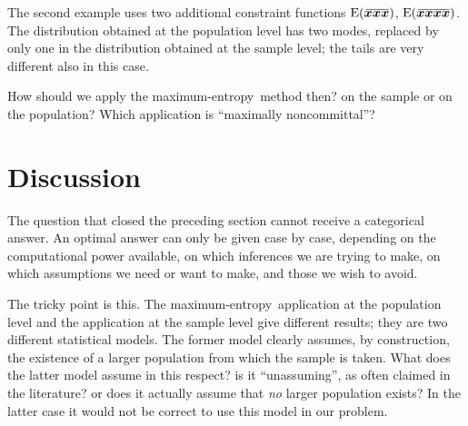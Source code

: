\documentclass{article}
\theoremstyle{remark}
\theoremstyle{innote}
\renewcommand*{\|}{\mathpunct{|}}%
\newcommand*{\E}{\mathrm{E}}
\DeclarePairedDelimiter\expp{(}{)}
\newcommand*{\expe}{\E\expp}%
\theoremstyle{simple}
\newcommand*{\widebar}[1]{{\mkern1.5mu\skew{2}\overline{\mkern-1.5mu#1\mkern-1.5mu}\mkern 1.5mu}}
\newcommand*{\sav}{\widebar} %
\newcommand*{\yxx}{x}%
\newcommand*{\yx}{\bm{\yxx}}%
\newcommand*{\me}{maximum-entropy}
\begin{document}
The second
example uses two additional constraint functions $\expe{\sav{\yx\yx\yx}}$,
$\expe{\sav{\yx\yx\yx\yx}}$. The distribution obtained at the population
level has two modes, replaced by only one in the distribution obtained at
the sample level; the tails are very different also in this case.



\bigskip

How should we apply the \me\ method then? on the sample or on the
population? Which application is \enquote{maximally noncommittal}?

\section{Discussion}
\label{sec:discussion}

The question that closed the preceding section cannot receive a categorical
answer. An optimal answer can only be given case by case, depending on the
computational power available, on which inferences we are trying to make,
on which assumptions we need or want to make, and those we wish to avoid.

The tricky point is this. The \me\ application at the population level and
the application at the sample level give different results; they are two
different statistical models. The former model clearly assumes, by
construction, the existence of a larger population from which the sample is
taken. What does the latter model assume in this respect? is it
\enquote{unassuming}, as often claimed in the literature? or does it
actually assume that \emph{no} larger population exists? In the latter case
it would not be correct to use this model in our problem.
\end{document}
